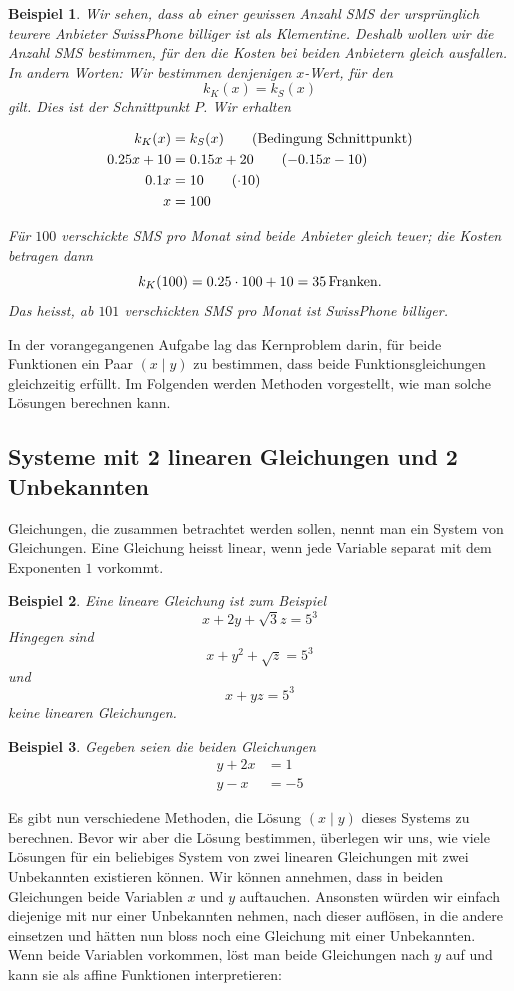 \documentclass[%
11pt,%
twoside,%
titlepage,%
swissgerman,%
headsepline%
]{scrartcl}
\theoremstyle{definition}
\newtheorem{bsp}{Beispiel}[subsection] %
\theoremstyle{plain}
\newtheorem{bsp}{Beispiel}[subsection] %
\theoremstyle{plain}
\begin{document}
\begin{bsp}
		Wir sehen, dass ab einer gewissen Anzahl SMS der ursprünglich teurere Anbieter SwissPhone billiger ist als Klementine. Deshalb wollen wir die Anzahl SMS bestimmen, für den die Kosten bei beiden Anbietern gleich ausfallen. In andern Worten: Wir bestimmen denjenigen $x$-Wert, für den
		$$k_K(x)=k_S(x)$$
		gilt. Dies ist der Schnittpunkt $P$.
		Wir erhalten
		
		\begin{align}
			k_K(x)&=k_S(x)\tag{Bedingung Schnittpunkt}\\
			0.25x+10&=0.15x+20\tag{$-0.15x-10$}\\
			0.1x&=10\tag{$\cdot10$}\\
			x&=100\notag
		\end{align}
		
		Für $100$ verschickte SMS pro Monat sind beide Anbieter gleich teuer; die Kosten betragen dann
		$$k_K(100)=0.25\cdot100+10=\unit[35]{Franken}.$$
		Das heisst, ab $101$ verschickten SMS pro Monat ist SwissPhone billiger.
	\end{bsp}
	
	In der vorangegangenen Aufgabe lag das Kernproblem darin, für beide Funktionen ein Paar $(x\mid y)$ zu bestimmen, dass beide Funktionsgleichungen gleichzeitig erfüllt. Im Folgenden werden Methoden vorgestellt, wie man solche Lösungen berechnen kann.
	
	\subsection{Systeme mit 2 linearen Gleichungen und 2 Unbekannten}
	
	Gleichungen, die zusammen betrachtet werden sollen, nennt man ein System von Gleichungen. Eine Gleichung heisst linear, wenn jede Variable separat mit dem Exponenten $1$ vorkommt.
	
	\begin{bsp}
		Eine lineare Gleichung ist zum Beispiel
		$$x+2y+\sqrt{3}z=5^3$$
		Hingegen sind
		$$x+y^2+\sqrt{z}=5^3$$
		und
		$$x+yz=5^3$$
		keine linearen Gleichungen.
	\end{bsp}
	
	\begin{bsp}
		Gegeben seien die beiden Gleichungen
		\begin{align}
			y+2x&=1\\
			y-x&=-5
		\end{align}
	\end{bsp}
	
	Es gibt nun verschiedene Methoden, die Lösung $(x\mid y)$ dieses Systems zu berechnen. Bevor wir aber die Lösung bestimmen, überlegen wir uns, wie viele Lösungen für ein beliebiges System von zwei linearen Gleichungen mit zwei Unbekannten existieren können.
	Wir können annehmen, dass in beiden Gleichungen beide Variablen $x$ und $y$ auftauchen. Ansonsten würden wir einfach diejenige mit nur einer Unbekannten nehmen, nach dieser  auflösen, in die andere einsetzen und hätten nun bloss noch eine Gleichung mit einer Unbekannten. Wenn beide Variablen vorkommen, löst man beide Gleichungen nach $y$ auf und kann sie als affine Funktionen interpretieren:
	
\end{document}
